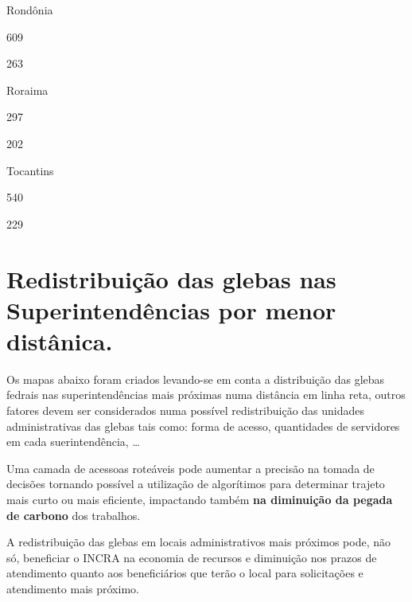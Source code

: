 \documentclass[
  letterpaper,
]{report}
\begin{document}
\n    

\n      

Rondônia

\n      

609

\n      

263

\n    

\n    

\n      

Roraima

\n      

297

\n      

202

\n    

\n    

\n      

Tocantins

\n      

540

\n      

229

\n    

\n  

\n

\hypertarget{redistribuiuxe7uxe3o-das-glebas-nas-superintenduxeancias-por-menor-distuxe2nica.}{%
\section{Redistribuição das glebas nas Superintendências por menor
distânica.}\label{redistribuiuxe7uxe3o-das-glebas-nas-superintenduxeancias-por-menor-distuxe2nica.}}

Os mapas abaixo foram criados levando-se em conta a distribuição das
glebas fedrais nas superintendências mais próximas numa distância em
linha reta, outros fatores devem ser considerados numa possível
redistribuição das unidades administrativas das glebas tais como: forma
de acesso, quantidades de servidores em cada suerintendência, \ldots{}

Uma camada de acessoas roteáveis pode aumentar a precisão na tomada de
decisões tornando possível a utilização de algorítimos para determinar
trajeto mais curto ou mais eficiente, impactando também \textbf{na
diminuição da pegada de carbono} dos trabalhos.

A redistribuição das glebas em locais administrativos mais próximos
pode, não só, beneficiar o INCRA na economia de recursos e diminuição
nos prazos de atendimento quanto aos beneficiários que terão o local
para solicitações e atendimento mais próximo.
\end{document}

